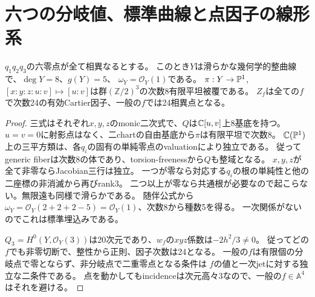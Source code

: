 \section{六つの分岐値、標準曲線と点因子の線形系}
\begin{theorem}[全ての分岐値が異なる対角族]
\label{thm:point-canonical-curve}
$q_1q_2q_3$の六零点が全て相異なるとする。
このとき$Y$は滑らかな幾何学的整曲線で、$\deg Y=8$、$g(Y)=5$、
$\omega_Y=\mathcal O_Y(1)$である。
$\pi:Y\to\mathbb P^1$, $[x:y:z:u:v]\mapsto[u:v]$は群$(\mathbb Z/2)^3$の次数8有限平坦被覆である。
$Z_f$は全ての$f$で次数24の有効Cartier因子、一般の$f$では24相異点となる。
\end{theorem}
\begin{proof}
三式はそれぞれ$x,y,z$のmonic二次式で、$Q$は$\mathbb C[u,v]$上8基底を持つ。
$u=v=0$に射影点はなく、二chartの自由基底から$\pi$は有限平坦で次数8。
$\mathbb C(\mathbb P^1)$上の三平方類は、各$q_i$の固有の単純零点のvaluationにより独立である。
従ってgeneric fiberは次数8の体であり、torsion-freenessから$Q$も整域となる。
$x,y,z$が全て非零ならJacobian三行は独立。
一つが零なら対応する$q_i$の根の単純性と他の二座標の非消滅から再びrank3。
二つ以上が零なら共通根が必要なので起こらない。無限遠も同様で滑らかである。
随伴公式から$\omega_Y=\mathcal O_Y(2+2+2-5)=\mathcal O_Y(1)$、次数8から種数5を得る。
一次関係がないのでこれは標準埋込みである。

$Q_3=H^0(Y,\mathcal O_Y(3))$は20次元であり、$w_f$の$xyz$係数は$-2h^2/3\ne0$。
従ってどの$f$でも非零切断で、整性から正則、因子次数は24となる。
一般の$f$は有限個の分岐点で零とならず、非分岐点で二重零点となる条件は
$f$の値と一次jetに対する独立な二条件である。
点を動かしてもincidenceは次元高々3なので、一般の$f\in\mathbb A^4$はそれを避ける。
\end{proof}

